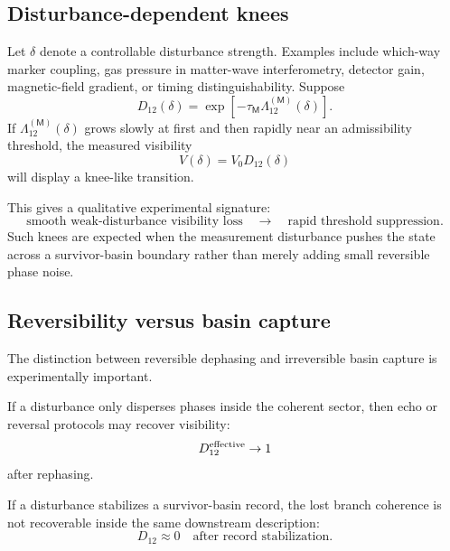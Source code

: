 \documentclass[11pt]{article}
\newcommand{\Meas}{\mathsf M}
\begin{document}
\subsection{Disturbance-dependent knees}
\label{subsec:disturbance-knees-phen}

Let \(\delta\) denote a controllable disturbance strength. Examples include which-way marker
coupling, gas pressure in matter-wave interferometry, detector gain, magnetic-field gradient,
or timing distinguishability. Suppose
\begin{equation}
  D_{12}(\delta)
  =
  \exp[-\tau_{\Meas}\Lambda_{12}^{(\Meas)}(\delta)].
  \label{eq:phen-D-delta}
\end{equation}
If \(\Lambda_{12}^{(\Meas)}(\delta)\) grows slowly at first and then rapidly near an admissibility
threshold, the measured visibility
\begin{equation}
  V(\delta)
  =
  V_0D_{12}(\delta)
  \label{eq:phen-V-delta}
\end{equation}
will display a knee-like transition.

This gives a qualitative experimental signature:
\begin{equation}
  \text{smooth weak-disturbance visibility loss}
  \quad\longrightarrow\quad
  \text{rapid threshold suppression}.
\end{equation}
Such knees are expected when the measurement disturbance pushes the state across a
survivor-basin boundary rather than merely adding small reversible phase noise.

\subsection{Reversibility versus basin capture}
\label{subsec:reversibility-phen}

The distinction between reversible dephasing and irreversible basin capture is experimentally
important.

If a disturbance only disperses phases inside the coherent sector, then echo or reversal
protocols may recover visibility:
\begin{equation}
  D_{12}^{\rm effective}\to1
\end{equation}
after rephasing.

If a disturbance stabilizes a survivor-basin record, the lost branch coherence is not recoverable
inside the same downstream description:
\begin{equation}
  D_{12}\approx0
  \quad\text{after record stabilization}.
\end{equation}
\end{document}
